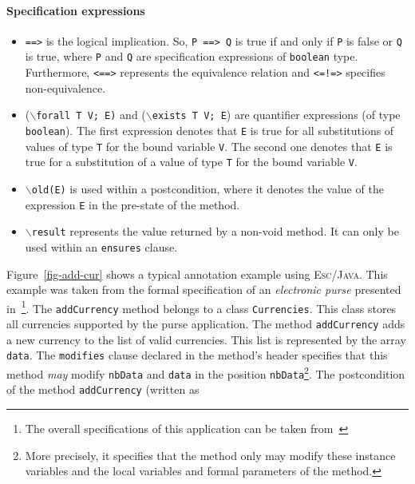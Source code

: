 \documentclass[a4paper]{llncs}
\newcommand{\escj}{\textsc{Esc/Java}}
\begin{document}
\paragraph{\bf Specification expressions} 
\begin{itemize} 
\item{\texttt{==>}} is the logical implication. So, \texttt{P 
==> Q} is true if and only if \texttt{P} is false or \texttt{Q} is 
true, where \texttt{P} and \texttt{Q} are specification expressions of  
\texttt{boolean} type. Furthermore, \texttt{<==>} represents the 
equivalence relation and \texttt{<=!=>} specifies non-equivalence. 
 
\item {($\backslash$\texttt{forall T V; E)} and 
($\backslash$\texttt{exists T V; E})} are quantifier expressions (of 
type \texttt{boolean}).  The first expression denotes that \texttt{E}
is true
for all substitutions of values of type \texttt{T} for the bound 
variable \texttt{V}. The second one denotes that \texttt{E} is true 
for a substitution of a value of type \texttt{T} for the bound 
variable \texttt{V}. 
 
\item{\texttt{$\backslash$old(E)}} is used within a postcondition,
where it denotes the value of the expression \texttt{E} in the
pre-state of the method.
 
\item {\tt$\backslash$result} represents the value returned by 
a non-void method. It can only be used within an
\texttt{ensures} clause.
\end{itemize}
Figure~\ref{fig-add-cur} shows a typical annotation example using 
\escj. This example was taken from the formal specification of an
\emph{electronic purse} presented in~\cite{CatanoH02a}\footnote{The overall
specifications of this application can be taken
from~\cite{CatanoH01URL}}. The \texttt{addCurrency} method belongs
to a class \texttt{Currencies}. This class stores all currencies 
supported by the purse application. The method 
\texttt{addCurrency} adds a new currency to the list of valid 
currencies. This list is represented by the 
array \texttt{data}. The \texttt{modifies} clause declared in the 
method's header specifies that 
this method \emph{may} modify \texttt{nbData} and 
\texttt{data} in the position \texttt{nbData}\footnote{More precisely,
it specifies that the method only may modify these instance variables
and the local variables and formal parameters of the method.}. The
postcondition of the method \texttt{addCurrency} (written as 
\end{document}
